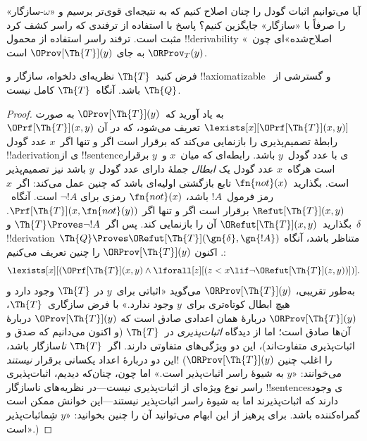 \documentclass[../../../include/open-logic-section]{subfiles}
\begin{document}


آیا می‌توانیم اثبات گودل را چنان اصلاح کنیم که به نتیجه‌ای قوی‌تر برسیم
و «$\omega$-سازگار» را صرفاً با «سازگار» جایگزین کنیم؟ پاسخ با استفاده
از ترفندی که راسر کشف کرد مثبت است. ترفند راسر استفاده از محمول
!!{derivability} «اصلاح‌شده»ای چون~$\ORProv_T(y)$ به جای
$\OProv[\Th{T}](y)$ است.

\begin{thm}
فرض کنید~$\Th{T}$ نظریه‌ای دلخواه، سازگار و !!{axiomatizable} و
گسترشی از~$\Th{Q}$ باشد. آنگاه~$\Th{T}$ کامل نیست.
\end{thm}

\begin{proof}
به یاد آورید که~$\OProv[\Th{T}](y)$ به صورت
$\lexists[x][\OPrf[\Th{T}](x, y)]$ تعریف می‌شود، که در آن
$\OPrf[\Th{T}](x, y)$ رابطهٔ تصمیم‌پذیری را بازنمایی می‌کند که برقرار
است اگر و تنها اگر~$x$ عدد گودل !!a{derivation}ی از !!{sentence}ی با
عدد گودل~$y$ باشد. رابطه‌ای که میان~$x$ و~$y$ برقرار است هرگاه~$x$
عدد گودل یک \emph{ابطال} جملهٔ دارای عدد گودل~$y$ باشد نیز تصمیم‌پذیر
است. بگذارید~$\fn{not}(x)$ تابع بازگشتی اولیه‌ای باشد که چنین عمل
می‌کند: اگر~$x$ رمز فرمول~$!A$ باشد، $\fn{not}(x)$ رمزی برای
$\lnot !A$ است. آنگاه~$\Refut[\Th{T}](x, y)$ برقرار است اگر و تنها اگر
$\Prf[\Th{T}](x, \fn{not}(y))$. بگذارید~$\ORefut[\Th{T}](x, y)$ آن را
بازنمایی کند. پس اگر~$\Th{T} \Proves \lnot !A$ و~$\delta$
!!{derivation} متناظر باشد، آنگاه
$\Th{Q} \Proves \ORefut[\Th{T}](\gn{\delta}, \gn{!A})$. اکنون
$\ORProv[\Th{T}](y)$ را چنین تعریف می‌کنیم:
\[
\lexists[x][(\OPrf[\Th{T}](x,y) \land \lforall[z][(z < x \lif \lnot
  \ORefut[\Th{T}](z,y))])].
\]
به‌طور تقریبی، $\ORProv[\Th{T}](y)$ می‌گوید «اثباتی برای~$y$ در
$\Th{T}$ وجود دارد و هیچ ابطال کوتاه‌تری برای~$y$ وجود ندارد.» با فرض
سازگاری~$\Th{T}$، $\ORProv[\Th{T}](y)$ دربارهٔ همان اعدادی صادق است که
$\OProv[\Th{T}](y)$ دربارهٔ آن‌ها صادق است؛ اما از دیدگاه
\emph{اثبات‌پذیری} در~$\Th{T}$ (و اکنون می‌دانیم که صدق و اثبات‌پذیری
متفاوت‌اند)، این دو ویژگی‌های متفاوتی دارند. اگر~$\Th{T}$
\emph{نا}سازگار باشد، این دو دربارهٔ اعداد یکسانی برقرار \emph{نیستند}!{}
($\ORProv[\Th{T}](y)$ را اغلب چنین می‌خوانند: «$y$ به شیوهٔ راسر
اثبات‌پذیر است.» اما چون، چنان‌که دیدیم، اثبات‌پذیری راسر نوع ویژه‌ای از
اثبات‌پذیری نیست---در نظریه‌های ناسازگار !!{sentence}sی وجود دارند که
اثبات‌پذیرند اما به شیوهٔ راسر اثبات‌پذیر نیستند---این خوانش ممکن است
گمراه‌کننده باشد. برای پرهیز از این ابهام می‌توانید آن را چنین بخوانید:
«$y$ شِماثبات‌پذیر است».)


\end{proof}
\end{document}
